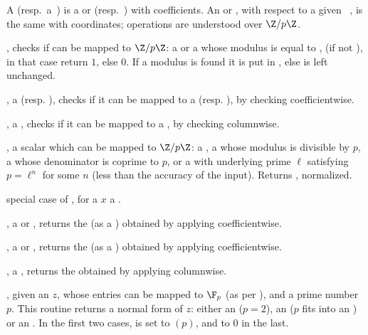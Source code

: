 A 
(resp.~a~) is a  or  (resp.~) with
 coefficients. An  or , with respect to a given
~, is the same with  coordinates; operations are
understood over $\Z/p\Z$.


, checks if  can be mapped to
$\Z/p\Z$: a  or a  whose modulus is equal to ,
(if  not ), in that case return $1$, else $0$. If a modulus
is found it is put in , else  is left unchanged.

,  a  (resp. ),
checks if it can be mapped to a  (resp. ), by checking
 coefficientwise.

,  a ,
checks if it can be mapped to a , by checking 
columnwise.

,  a scalar which can be mapped to
$\Z/p\Z$: a , a  whose modulus is divisible by $p$,
a  whose denominator is coprime to $p$, or a  with
underlying prime $\ell$ satisfying $p = \ell^n$ for some $n$ (less than the
accuracy of the input). Returns , normalized.

 special case of ,
for a $x$ a .

,  a  or ,
returns the  (as a ) obtained by applying 
coefficientwise.

,  a  or ,
returns the  (as a ) obtained by applying 
coefficientwise.

,  a ,
returns the  obtained by applying 
columnwise.

, given an  $z$,
whose entries can be mapped to $\F_p$ (as per ), and a prime
number $p$. This routine returns a normal form of $z$: either an
 ($p = 2$), an  ($p$ fits into an )
or an . In the first two cases,  is set to $(p)$,
and to $0$ in the last.


